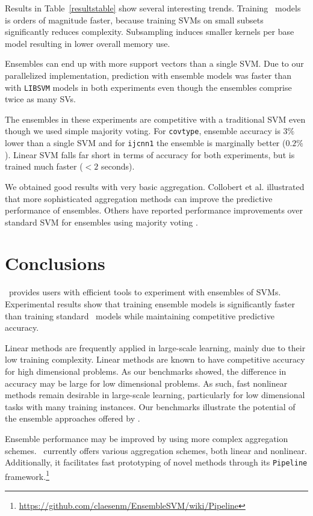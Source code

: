 {\noindent}Results in Table~\ref{resultstable} show several interesting trends. Training \esvm\ models is orders of magnitude faster,
because training SVMs on small subsets significantly reduces complexity. Subsampling induces smaller kernels per base model resulting in lower overall memory use.

Ensembles can end up with more support vectors than a single SVM. Due to our parallelized implementation, prediction with ensemble models was faster than with \texttt{LIBSVM} models in both experiments even though the ensembles comprise twice as many SVs.

The ensembles in these experiments are competitive with a traditional SVM even though we used simple majority voting. For \texttt{covtype}, ensemble accuracy is $3\%$ lower than a single SVM and for \texttt{ijcnn1} the ensemble is marginally better ($0.2\%$). Linear SVM falls far short in terms of accuracy for both experiments, but is trained much faster ($< 2$ seconds).

We obtained good results with very basic aggregation. Collobert et al. \citep{Collobert02} illustrated that more sophisticated aggregation methods can improve the predictive performance of ensembles. Others have reported performance improvements over standard SVM for
ensembles using majority voting \citep{Valentini03lowbias,Wang20096466}.
 
\section{Conclusions}
\esvm\ provides users with efficient tools to experiment with ensembles of
SVMs. Experimental results show that training ensemble models is significantly
faster than training standard \libsvm\ models while maintaining competitive predictive accuracy.

Linear methods are frequently applied in large-scale learning, mainly due to their low training complexity. Linear methods are known to have competitive accuracy for high dimensional problems. As our benchmarks showed, the difference in accuracy may be large for low dimensional problems. As such, fast nonlinear methods remain desirable in large-scale learning, particularly for low dimensional tasks with many training instances. Our benchmarks illustrate the potential of the ensemble approaches offered by \esvm.

Ensemble performance may be improved by using more complex aggregation schemes. \esvm\ currently offers various aggregation schemes, both linear and nonlinear. Additionally, it facilitates fast prototyping of novel methods through its \texttt{Pipeline} framework.\footnote{\url{https://github.com/claesenm/EnsembleSVM/wiki/Pipeline}}


